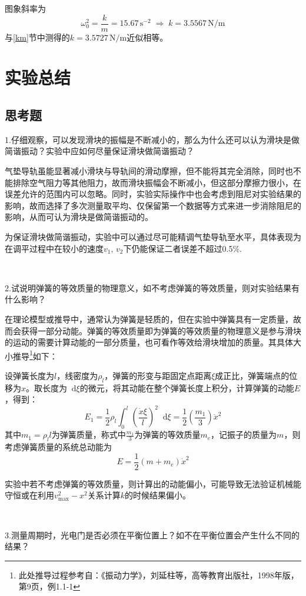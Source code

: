 \documentclass[UTF-8,twoside,cs4size]{ctexart}
\newcommand*{\dif}{\mathop{}\!\mathrm{d}}
\begin{document}
	图象斜率为\[ \omega_0^2=\frac km=15.67\,\mathrm{s^{-2}}\;\Longrightarrow\; k=3.5567\,\mathrm{N/m}\]
	与\ref{km}节中测得的$ k=3.5727\,\mathrm{N/m} $近似相等。
	\section{实验总结}
	\subsection{思考题}
	1.仔细观察，可以发现滑块的振幅是不断减小的，那么为什么还可以认为滑块是做简谐振动？实验中应如何尽量保证滑块做简谐振动？
	
	{\kaishu 气垫导轨虽能显著减小滑块与导轨间的滑动摩擦，但不能将其完全消除，同时也不能排除空气阻力等其他阻力，故而滑块振幅会不断减小，但这部分摩擦力很小，在误差允许的范围内可以忽略。同时，实验实际操作中也会考虑到阻尼对实验结果的影响，故而选择了多次测量取平均、仅保留第一个数据等方式来进一步消除阻尼的影响，从而可认为滑块是做简谐振动的。}
	
	{\kaishu 为保证滑块做简谐振动，实验中可以通过尽可能精调气垫导轨至水平，具体表现为在调平过程中在较小的速度$ v_1,\,v_2 $下仍能保证二者误差不超过0.5\%.}
	
	~\
	
	2.试说明弹簧的等效质量的物理意义，如不考虑弹簧的等效质量，则对实验结果有什么影响？
	
	{\kaishu 在理论模型或推导中，通常认为弹簧是轻质的，但在实验中弹簧具有一定质量，故而会获得一部分动能。弹簧的等效质量即为弹簧的等效质量的物理意义是参与滑块的运动的需要计算动能的一部分质量，也可看作等效给滑块增加的质量。其具体大小推导\footnote{此处推导过程参考自：《振动力学》，刘延柱等，高等教育出版社，1998年版，第9页，例1.1-1}如下：}
		
	{\kaishu 设弹簧长度为$ l $，线密度为$ \rho_l $，弹簧的形变与距固定点距离$ \xi $成正比，弹簧端点的位移为$ x $。取长度为$ \dif\xi $的微元，将其动能在整个弹簧长度上积分，计算弹簧的动能$ E $，得到：}	
	\[E_1=\frac12\rho_l\int_0^l\left(\frac{\dot x\xi}{l}\right)^2\dif\xi=\frac12\left(\frac{m_1}{3}\right)\dot x^2\]
	{\kaishu 其中$ m_1=\rho_ll $为弹簧质量，称式中$ \frac{m_1}{3} $为弹簧的等效质量$ m_e $，记振子的质量为$ m $，则考虑弹簧质量的系统总动能为}
	\[E=\frac12(m+m_e)\dot x^2\]
	
	{\kaishu 实验中若不考虑弹簧的等效质量，则计算出的动能偏小，可能导致无法验证机械能守恒或在利用$ v_\max^2-x^2 $关系计算$ k $的时候结果偏小。}
	
	~\
	
	3.测量周期时，光电门是否必须在平衡位置上？如不在平衡位置会产生什么不同的结果？
	
\end{document}
